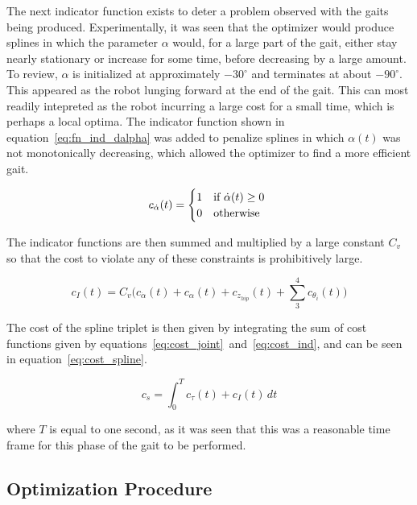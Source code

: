The next indicator function exists to deter a problem observed with the gaits being produced. 
Experimentally, it was seen that the optimizer would produce splines in which the parameter
$\alpha$ would, for a large part of the gait, either stay nearly stationary or increase for some time, before
decreasing by a large amount.
To review, $\alpha$ is initialized at approximately $-30^\circ$ and terminates at about $-90^\circ$.
This appeared as the robot lunging forward at the end of the gait.
This can most readily intepreted as the robot incurring a large cost for a small time, which is perhaps
a local optima. The indicator function shown in equation~\ref{eq:fn_ind_dalpha} was added to penalize splines in which 
$\alpha (t)$ was not monotonically decreasing, which allowed the optimizer to find a more efficient gait.

\begin{equation} 
	c_{\dot \alpha}(t) =
  	\begin{cases} 
    \hfill 1 \hfill & \text{if $\dot \alpha(t) \ge 0$ } \\
    \hfill 0 \hfill & \text{otherwise}
  	\end{cases} \label{eq:fn_ind_dalpha}
\end{equation}

The indicator functions are then summed and multiplied by a large constant $C_v$ so that the cost to
violate any of these constraints is prohibitively large.

\begin{equation}
	c_I(t) = C_v \Big( c_{\dot \alpha}(t) + c_{\alpha}(t) + c_{z_{hip}}(t) + \sum_3^4 c_{\theta_i}(t) \Big) \label{eq:cost_ind}
\end{equation}

The cost of the spline triplet is then given by integrating the sum of cost functions given by
equations~\ref{eq:cost_joint}~and~\ref{eq:cost_ind}, and can be seen in equation~\ref{eq:cost_spline}.

\begin{equation}
c_s = \int_0^T c_{\tau}(t) + c_I(t) \, dt \label{eq:cost_spline}
\end{equation}

where $T$ is equal to one second, as it was seen that this was a reasonable time frame for this phase of the gait
to be performed. 

\subsection{Optimization Procedure} \label{subsec:crawl_opt_procedure}

